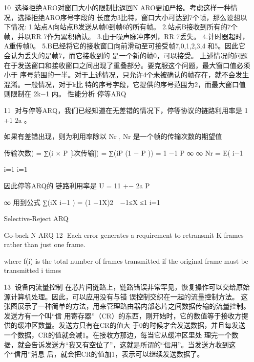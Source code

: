                                                         10
选择拒绝ARO对窗口大小的限制比返回N ARO更加严格。考虑这样一种情况，选择拒绝ARO序号字段的
长度为3比特，窗口大小可达到7个帧，那么设想以下情况:
1.站点A向站点B发送从帧0到帧6的所有帧。
2.站点B接收到所有的7个帧，并以RR 7作为累积确认。
3.由于噪声脉冲序列，RR 7丢失。
4.计时器超时，A重传帧0。
5.B已经将它的接收窗口向前滑动至可接受帧7,0,1,2,3,4 和5。因此它会认为丢失的是帧7，而它接收到的
是一个新的帧0，可以接受。
上述情况的问题在于发送窗口和接收窗口之间出现了重叠部分。要克服这个问题，最大窗口值必须小于
序号范围的一半。对于上述情况，只允许4个未被确认的帧存在，就不会发生混淆。一般情况，对于k比
特的序号字段，它提供的序号范围为2，而最大窗口值则限制在 2k−1 内。
性能分析
停等ARQ


                                                      11
对与停等ARQ，我们已经知道在无差错的情况下，停等协议的链路利用率是 1 +1 2a 。                     ​




如果有差错出现，则为利用率除以 Nr , Nr 是一个帧的传输次数的期望值
                                 ​       ​




         传输次数) = ∑(i × P [i次传输]) = ∑(iP (1 − P )) = 1 −1 P
                       ∞                         ∞
Nr = E(
   ​                         ​                         ​
                                                           i−1
                                                                     ​




                       i=1                       i=1

因此停等ARQ的 链路利用率是 U = 11 +− 2a
                          P
                                             ​




          ∞
用到公式 ∑(iX i−1 ) = (1 −1X)2
               ​                     ​       −1≤X ≤1
         i=1


Selective-Reject ARQ




Go-back N ARQ
                                                                         12
Each error generates a requirement to retransmit K frames rather than just
one frame.


where f(i) is the total number of frames transmitted if the original frame must be
transmitted i times




                                                                                     13
设备内流量控制
在芯片间链路上，链路错误非常罕见，恢复操作可以交给原始源计算机处理。因此，可以应用没有与错
误控制交织在一起的流量控制方法。
这张图展示了一种简单的方法，用来管理路由器内部芯片之间数据传输的流量控制。发送方有一个叫“信
用寄存器”（CR）的东西，刚开始时，它的数值等于接收方提供的缓冲区数量。发送方只有在CR的值大
于0的时候才会发送数据，并且每发送一个数据，CR的值就会减1。在接收方那边，每当它从缓冲区里处
理完一个数据，就会告诉发送方“我又有空位了”，这就是所谓的“信用”。当发送方收到这个“信用”消息
后，就会把CR的值加1，表示可以继续发送数据了。




